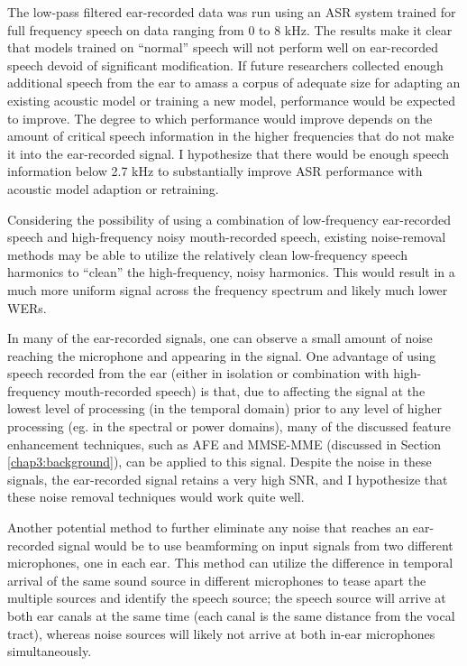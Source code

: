 \documentclass[dissertation,copyright]{uathesis}
\begin{document}
The low-pass filtered ear-recorded data was run using an ASR system trained for full frequency speech on data ranging from 0 to 8 kHz.  The results make it clear that models trained on ``normal'' speech will not perform well on ear-recorded speech devoid of significant modification.  If future researchers collected enough additional speech from the ear to amass a corpus of adequate size for adapting an existing acoustic model or training a new model, performance would be expected to improve.  The degree to which performance would improve depends on the amount of critical speech information in the higher frequencies that do not make it into the ear-recorded signal.  I hypothesize that there would be enough speech information below 2.7 kHz to substantially improve ASR performance with acoustic model adaption or retraining.

Considering the possibility of using a combination of low-frequency ear-recorded speech and high-frequency noisy mouth-recorded speech, existing noise-removal methods may be able to utilize the relatively clean low-frequency speech harmonics to ``clean'' the high-frequency, noisy harmonics.  This would result in a much more uniform signal across the frequency spectrum and likely much lower WERs.

In many of the ear-recorded signals, one can observe a small amount of noise reaching the microphone and appearing in the signal.  One advantage of using speech recorded from the ear (either in isolation or combination with high-frequency mouth-recorded speech) is that, due to affecting the signal at the lowest level of processing (in the temporal domain) prior to any level of higher processing (eg. in the spectral or power domains), many of the discussed feature enhancement techniques, such as AFE and MMSE-MME (discussed in Section \ref{chap3:background}), can be applied to this signal.  Despite the noise in these signals, the ear-recorded signal retains a very high SNR, and I hypothesize that these noise removal techniques would work quite well.

Another potential method to further eliminate any noise that reaches an ear-recorded signal would be to use beamforming on input signals from two different microphones, one in each ear.  This method can utilize the difference in temporal arrival of the same sound source in different microphones to tease apart the multiple sources and identify the speech source; the speech source will arrive at both ear canals at the same time (each canal is the same distance from the vocal tract), whereas noise sources will likely not arrive at both in-ear microphones simultaneously.
\end{document}
